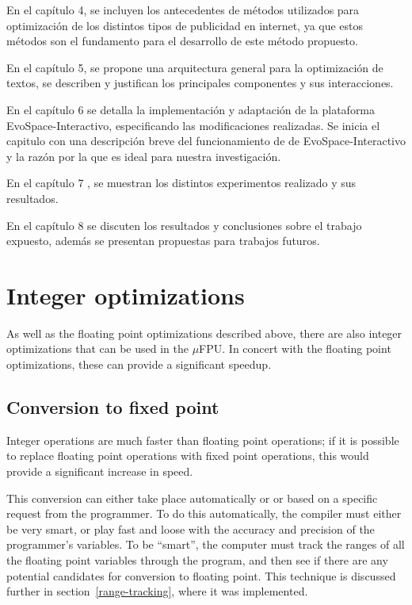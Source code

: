 En el capítulo 4, se incluyen los antecedentes de métodos utilizados para optimización de los distintos tipos de publicidad en internet,  ya que estos métodos son el fundamento para el desarrollo de este método propuesto.


En el capítulo 5, se propone una arquitectura general para la optimización de textos, se describen y justifican los principales componentes y sus interacciones.

En el capítulo 6 se detalla la implementación y adaptación de la plataforma EvoSpace-Interactivo, especificando las modificaciones realizadas. Se inicia el capitulo con una descripción breve del funcionamiento de de EvoSpace-Interactivo y la razón por la que es ideal para nuestra investigación.

En el capítulo 7 , se muestran los distintos experimentos realizado y sus  resultados.

En el capítulo 8 se discuten los resultados y conclusiones sobre el trabajo expuesto, además se presentan propuestas para trabajos futuros.

\section{Integer optimizations}

As well as the floating point optimizations described above, there are
also integer optimizations that can be used in the $\mu$FPU.  In concert
with the floating point optimizations, these can provide a significant
speedup.  

\subsection{Conversion to fixed point}

Integer operations are much faster than floating point operations; if it is
possible to replace floating point operations with fixed point operations,
this would provide a significant increase in speed.

This conversion can either take place automatically or or based on a
specific request from the programmer.  To do this automatically, the
compiler must either be very smart, or play fast and loose with the accuracy
and precision of the programmer's variables.  To be ``smart'', the computer
must track the ranges of all the floating point variables through the
program, and then see if there are any potential candidates for conversion
to floating point.  This technique is discussed further in
section~\ref{range-tracking}, where it was implemented.


